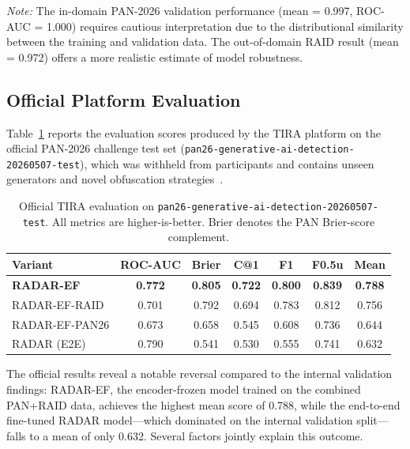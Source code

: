 \documentclass[]{ceurart}
\begin{document}
\noindent\textit{Note:} The in-domain PAN-2026 validation performance (mean = 0.997, ROC-AUC = 1.000) requires cautious interpretation due to the distributional similarity between the training and validation data. The out-of-domain RAID result (mean = 0.972) offers a more realistic estimate of model robustness.

\subsection{Official Platform Evaluation}

Table~\ref{tab:official} reports the evaluation scores produced by the TIRA platform on the official PAN-2026 challenge test set (\texttt{pan26-generative-ai-detection-20260507-test}), which was withheld from participants and contains unseen generators and novel obfuscation strategies~\cite{bevendorff:2026c}.

\begin{table}[ht]
\centering
\caption{Official TIRA evaluation on \texttt{pan26-generative-ai-detection-20260507-test}.
  All metrics are higher-is-better. Brier denotes the PAN Brier-score complement.}
\label{tab:official}
\begingroup
\small
\setlength{\tabcolsep}{3pt}
\renewcommand{\arraystretch}{1.2}
\begin{tabular}{lcccccc}
\toprule
\textbf{Variant} & \textbf{ROC-AUC} & \textbf{Brier} & \textbf{C@1} & \textbf{F1} & \textbf{F0.5u} & \textbf{Mean} \\
\midrule
\textbf{RADAR-EF} & \textbf{0.772} & \textbf{0.805} & \textbf{0.722} & \textbf{0.800} & \textbf{0.839} & \textbf{0.788} \\
RADAR-EF-RAID    & 0.701 & 0.792 & 0.694 & 0.783 & 0.812 & 0.756 \\
RADAR-EF-PAN26   & 0.673 & 0.658 & 0.545 & 0.608 & 0.736 & 0.644 \\
RADAR (E2E)      & 0.790 & 0.541 & 0.530 & 0.555 & 0.741 & 0.632 \\
\bottomrule
\end{tabular}
\endgroup
\end{table}

The official results reveal a notable reversal compared to the internal validation findings: RADAR-EF, the encoder-frozen model trained on the combined PAN+RAID data, achieves the highest mean score of 0.788, while the end-to-end fine-tuned RADAR model---which dominated on the internal validation split---falls to a mean of only 0.632. Several factors jointly explain this outcome.
\end{document}
